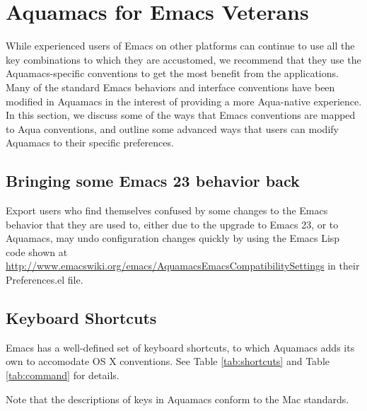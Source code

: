 \documentclass[11pt,letterpaper]{article}
\begin{document}
\section{Aquamacs for Emacs Veterans}

While experienced users of Emacs on other platforms can continue to use all the key combinations to which they are accustomed, we recommend that they use the Aquamacs-specific conventions to get the most benefit from the applications.  Many of the standard Emacs behaviors and interface conventions have been modified in Aquamacs in the interest of providing a more Aqua-native experience. In this section, we discuss some of the ways that Emacs conventions are mapped to Aqua conventions, and outline some advanced ways that users can modify Aquamacs to their specific preferences.

\subsection{Bringing some Emacs 23 behavior back}

Export users who find themselves confused by some changes to the Emacs behavior that they are used to, either due to the upgrade to Emacs 23, or to Aquamacs, may undo configuration changes quickly by using the Emacs Lisp code shown at \url{http://www.emacswiki.org/emacs/AquamacsEmacsCompatibilitySettings} in their Preferences.el file.

\subsection{Keyboard Shortcuts}
Emacs has a well-defined set of keyboard shortcuts, to which Aquamacs adds its own to accomodate OS X conventions. See Table \ref{tab:shortcuts} and Table \ref{tab:command} for details.

Note that the descriptions of keys in Aquamacs conform to the Mac standards.
\end{document}
